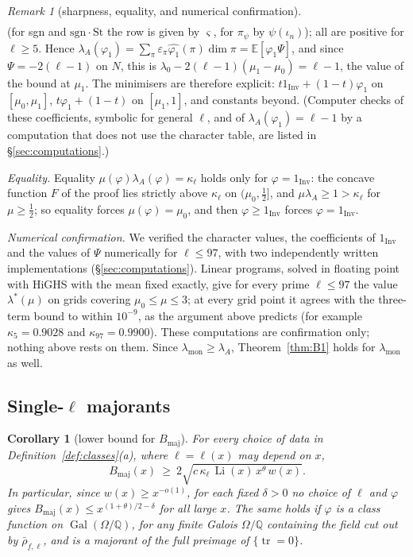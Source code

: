 \documentclass[11pt]{amsart}
\newtheorem{corB}[thmB]{Corollary}
\theoremstyle{definition}
\theoremstyle{remark}
\newtheorem{remark}[theorem]{Remark}
\newcommand{\Q}{\mathbb{Q}}
\DeclareMathOperator{\Gal}{Gal}
\DeclareMathOperator{\Li}{Li}
\DeclareMathOperator{\tr}{tr}
\newcommand{\Inv}{\mathrm{Inv}}
\begin{document}
\begin{remark}[sharpness, equality, and numerical confirmation]
\[\begin{array}{l|cccc}
  \end{array}
\]
(for sgn and $\mathrm{sgn}\cdot\mathrm{St}$ the row is given by $\varsigma$, for $\pi_\psi$ by $\psi(\iota_n)$); all are
positive for $\ell\ge5$. Hence $\lambda_A(\varphi_1)=\sum_\pi\varepsilon_\pi\widehat{\varphi_1}(\pi)\dim\pi=\mathbb E[\varphi_1\Psi]$,
and since $\Psi=-2(\ell-1)$ on $N$, this is $\lambda_0-2(\ell-1)(\mu_1-\mu_0)=\ell-1$, the value of the bound at $\mu_1$.
The minimisers are therefore explicit: $t1_{\Inv}+(1-t)\varphi_1$ on $[\mu_0,\mu_1]$, $t\varphi_1+(1-t)$ on $[\mu_1,1]$,
and constants beyond. (Computer checks of these coefficients, symbolic for general $\ell$, and of
$\lambda_A(\varphi_1)=\ell-1$ by a computation that does not use the character table, are listed in
\S\ref{sec:computations}.)

\emph{Equality.} Equality $\mu(\varphi)\lambda_A(\varphi)=\kappa_\ell$ holds only for $\varphi=1_{\Inv}$: the concave
function $F$ of the proof lies strictly above $\kappa_\ell$ on $(\mu_0,\frac12]$, and $\mu\lambda_A\ge1>\kappa_\ell$ for
$\mu\ge\frac12$; so equality forces $\mu(\varphi)=\mu_0$, and then $\varphi\ge1_{\Inv}$ forces $\varphi=1_{\Inv}$.

\emph{Numerical confirmation.} We verified the character values, the coefficients of $1_{\Inv}$ and the values of
$\Psi$ numerically for $\ell\le97$, with two independently written implementations (\S\ref{sec:computations}). Linear
programs, solved in floating point with HiGHS with the mean fixed exactly, give for every prime $\ell\le97$ the value
$\lambda^*(\mu)$ on grids covering $\mu_0\le\mu\le3$; at every grid point it agrees with the three-term bound to within
$10^{-9}$, as the argument above predicts (for example $\kappa_5=0.9028$ and $\kappa_{97}=0.9900$). These computations
are confirmation only; nothing above rests on them.
Since $\lambda_{\mathrm{mon}}\ge\lambda_A$, Theorem~\ref{thm:B1} holds for $\lambda_{\mathrm{mon}}$ as well.
\end{remark}

\subsection{Single-$\ell$ majorants}

\begin{corB}[lower bound for $B_{\mathrm{maj}}$]\label{cor:B2}
For every choice of data in Definition~\ref{def:classes}(a), where $\ell=\ell(x)$ may depend on $x$,
\[
  B_{\mathrm{maj}}(x)\ \ge\ 2\sqrt{c\,\kappa_\ell\,\Li(x)\,x^\theta\,w(x)} .
\]
In particular, since $w(x)\ge x^{-o(1)}$, for each fixed $\delta>0$ no choice of $\ell$ and $\varphi$ gives
$B_{\mathrm{maj}}(x)\le x^{(1+\theta)/2-\delta}$ for all large $x$. The same holds if $\varphi$ is a class function on
$\Gal(\Omega/\Q)$, for any finite Galois $\Omega/\Q$ containing the field cut out by $\bar\rho_{f,\ell}$, and is a
majorant of the full preimage of $\{\tr=0\}$.
\end{corB}
\end{document}

